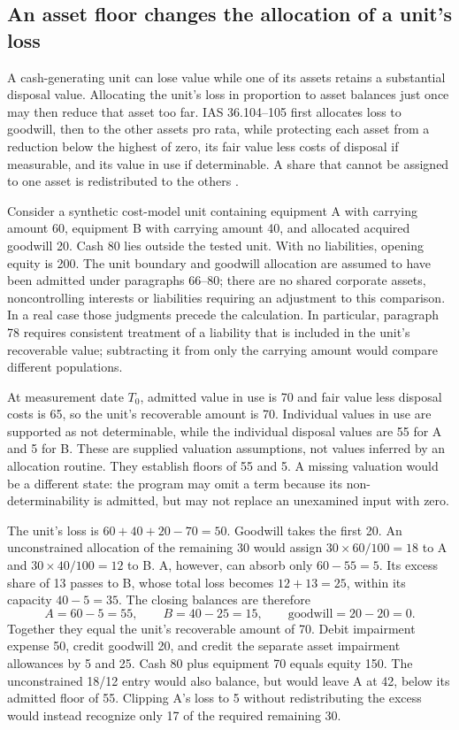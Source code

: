 \subsection{An asset floor changes the allocation of a unit's loss}
\label{sec:impairment-floors}

A cash-generating unit can lose value while one of its assets retains a
substantial disposal value. Allocating the unit's loss in proportion to asset
balances just once may then reduce that asset too far. IAS 36.104--105 first
allocates loss to goodwill, then to the other assets pro rata, while protecting
each asset from a reduction below the highest of zero, its fair value less
costs of disposal if measurable, and its value in use if determinable. A share
that cannot be assigned to one asset is redistributed to the others
\citep{eu20231803}.

Consider a synthetic cost-model unit containing equipment A with carrying
amount 60, equipment B with carrying amount 40, and allocated acquired
goodwill 20. Cash 80 lies outside the tested unit. With no liabilities, opening
equity is 200. The unit boundary and goodwill allocation are assumed to have
been admitted under paragraphs 66--80; there are no shared corporate assets,
noncontrolling interests or liabilities requiring an adjustment to this
comparison. In a real case those judgments precede the calculation. In
particular, paragraph 78 requires consistent treatment of a liability that is
included in the unit's recoverable value; subtracting it from only the carrying
amount would compare different populations.

At measurement date $T_0$, admitted value in use is 70 and fair value less
disposal costs is 65, so the unit's recoverable amount is 70. Individual
values in use are supported as not determinable, while the individual disposal
values are 55 for A and 5 for B. These are supplied valuation assumptions,
not values inferred by an allocation routine. They establish floors of 55
and 5. A missing valuation would be a different state: the program may omit
a term because its non-determinability is admitted, but may not replace an
unexamined input with zero.

The unit's loss is $60+40+20-70=50$. Goodwill takes the first 20. An
unconstrained allocation of the remaining 30 would assign
$30\times60/100=18$ to A and $30\times40/100=12$ to B. A, however, can
absorb only $60-55=5$. Its excess share of 13 passes to B, whose total loss
becomes $12+13=25$, within its capacity $40-5=35$. The closing balances are
therefore
\[
  A=60-5=55,\qquad B=40-25=15,\qquad
  \text{goodwill}=20-20=0.
\]
Together they equal the unit's recoverable amount of 70. Debit impairment
expense 50, credit goodwill 20, and credit the separate asset impairment
allowances by 5 and 25. Cash 80 plus equipment 70 equals equity 150. The
unconstrained 18/12 entry would also balance, but would leave A at 42,
below its admitted floor of 55. Clipping A's loss to 5 without redistributing
the excess would instead recognize only 17 of the required remaining 30.

